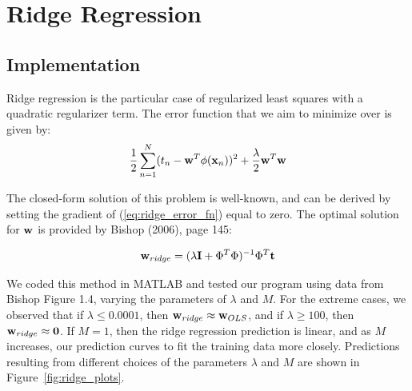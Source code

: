 
\section{Ridge Regression}\label{sec:ridge_reg}
\subsection{Implementation}
Ridge regression is the particular case of regularized least squares with a quadratic regularizer term.  The error function that we aim to minimize over is given by:
\begin{equation} \label{eq:ridge_error_fn}
\frac{1}{2} \sum_{n=1}^{N} (t_n - \boldsymbol{\mathbf{w}}^T \phi (\boldsymbol{\mathbf{x}}_n) )^2 + \frac{\lambda}{2} \boldsymbol{\mathbf{w}}^T \boldsymbol{\mathbf{w}}
\end{equation}

The closed-form solution of this problem is well-known, and can be derived by setting the gradient of (\ref{eq:ridge_error_fn}) equal to zero.  The optimal solution for $\boldsymbol{\mathbf{w}}$ is provided by Bishop (2006), page 145:

\begin{equation} \label{eq:ridge_sol}
\boldsymbol{\mathbf{w}}_{ridge} = (\lambda \boldsymbol{\mathbf{I}} + \Phi^T \Phi)^{-1} \Phi^T \boldsymbol{\mathbf{t}}
\end{equation}

We coded this method in MATLAB and tested our program using data from Bishop Figure 1.4, varying the parameters of $\lambda$ and $M$.  For the extreme cases, we observed that if $\lambda \leq 0.0001$, then $\boldsymbol{\mathbf{w}}_{ridge} \approx \boldsymbol{\mathbf{w}}_{OLS}$, and if $\lambda \geq 100$, then $\boldsymbol{\mathbf{w}}_{ridge} \approx \boldsymbol{\mathbf{0}}$.  If $M = 1$, then the ridge regression prediction is linear, and as $M$ increases, our prediction curves to fit the training data more closely.  Predictions resulting from different choices of the parameters $\lambda$ and $M$ are shown in Figure~\ref{fig:ridge_plots}.  

